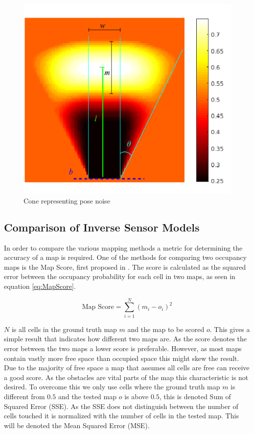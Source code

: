 \begin{figure}[htbp]
	\centering
	\includegraphics[width=\textwidth]{figures/static_mapping/cone_noise_top}
	\caption{Cone representing pose noise }
	\label{fig:cone_with_noise_top}
\end{figure}

\subsection{Comparison of Inverse Sensor Models}
In order to compare the various mapping methods a metric for determining the accuracy of a map is required. One of the methods for comparing two occupancy maps is the Map Score, first proposed in \cite{MoravecMartin}. The score is calculated as the squared error between the occupancy probability for each cell in two maps, as seen in equation \ref{eq:MapScore}.

\begin{equation}
\label{eq:MapScore}
\text{Map Score} = \sum_{i=1}^{N} (m_{i} - o_{i})^2
\end{equation}

$N$ is all cells in the ground truth map $m$ and the map to be scored $o$. 
This gives a simple result that indicates how different two maps are. As the score denotes the error between the two maps a lower score is preferable.  
However, as most maps contain vastly more free space than occupied space this might skew the result. 
Due to the majority of free space a map that assumes all cells are free can receive a  good score.
As the obstacles are vital parts of the map this characteristic is not desired. 
To overcome this we only use cells where the ground truth map $m$ is different from \(0.5\) and the tested map $o$ is above \(0.5\), this is denoted Sum of Squared Error (SSE).
As the SSE does not distinguish between the number of cells touched it is normalized with the number of cells in the tested map. This will be denoted the Mean Squared Error (MSE).  

